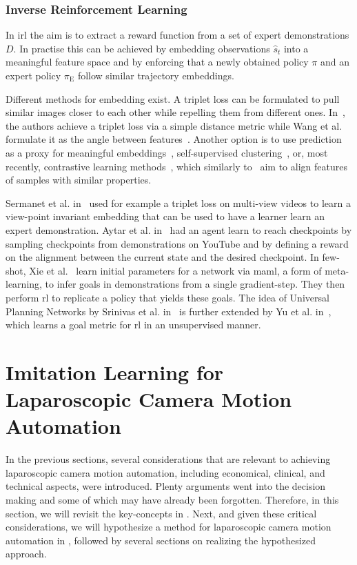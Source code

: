 \subsubsection{Inverse Reinforcement Learning}
In \gls{irl} the aim is to extract a reward function from a set of expert demonstrations $D$. In practise this can be achieved by embedding observations $\hat{s}_t$ into a meaningful feature space and by enforcing that a newly obtained policy $\pi$ and an expert policy $\pi_\text{E}$ follow similar trajectory embeddings.

Different methods for embedding exist. A triplet loss can be formulated to pull similar images closer to each other while repelling them from different ones. In~\cite{wang2014learning, schroff2015facenet}, the authors achieve a triplet loss via a simple distance metric while Wang et al. formulate it as the angle between features~\cite{wang2015unsupervised}. Another option is to use prediction as a proxy for meaningful embeddings~\cite{vondrick2016anticipating, sermanet2016unsupervised, srivastava2015unsupervised, mathieu2015deep}, self-supervised clustering~\cite{caron2018deep}, or, most recently, contrastive learning methods~\cite{khosla2020supervised}, which similarly to~\cite{wang2015unsupervised} aim to align features of samples with similar properties.

Sermanet et al. in~\cite{sermanet2018time} used for example a triplet loss on multi-view videos to learn a view-point invariant embedding that can be used to have a learner learn an expert demonstration. Aytar et al. in~\cite{aytar2018playing} had an agent learn to reach checkpoints by sampling checkpoints from demonstrations on YouTube and by defining a reward on the alignment between the current state and the desired checkpoint. In few-shot, Xie et al.~\cite{xie2018few} learn initial parameters for a network via \gls{maml}, a form of meta-learning, to infer goals in demonstrations from a single gradient-step. They then perform \gls{rl} to replicate a policy that yields these goals. The idea of Universal Planning Networks by Srinivas et al. in~\cite{srinivas2018universal} is further extended by Yu et al. in~\cite{yu2019unsupervised}, which learns a goal metric for \gls{rl} in an unsupervised manner.

\section[Imitation Learning for Robotic Laparoscopy]{Imitation Learning for Laparoscopic Camera Motion Automation}
\label{in:sec:imitation_learning_for_camera_motion_automation}
In the previous sections, several considerations that are relevant to achieving laparoscopic camera motion automation, including economical, clinical, and technical aspects, were introduced. Plenty arguments went into the decision making and some of which may have already been forgotten. Therefore, in this section, we will revisit the key-concepts in . Next, and given these critical considerations, we will hypothesize a method for laparoscopic camera motion automation in , followed by several sections on realizing the hypothesized approach.

